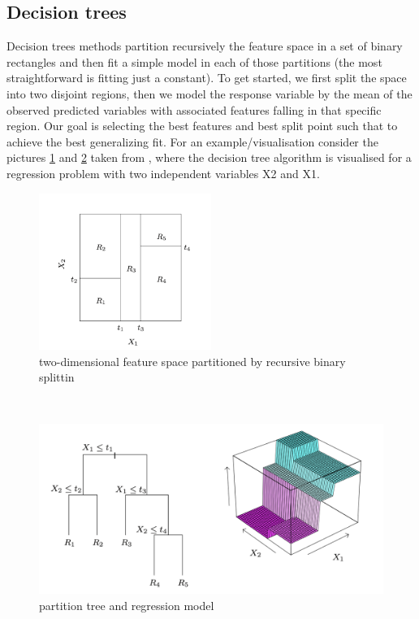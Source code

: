 \subsection{Decision trees}
Decision trees methods partition recursively the feature space in a set of binary rectangles and then fit a simple model in each of those partitions (the most straightforward is fitting just a constant).
To get started, we first split the space into two disjoint regions, then we model the response variable by the mean of the observed predicted variables with associated features falling in that specific region. Our goal is selecting the best features and best split point such that to achieve the best generalizing fit.
For an example/visualisation consider the pictures \ref{fig:elements_statistical_learning1} and \ref{fig:elements_statistical_learning2} taken from \cite{hastie2009elements}, where the decision tree algorithm is visualised for a regression problem with two independent variables X2 and X1.
\begin{figure}
    \includegraphics[width=0.5\textwidth]{images/elsii1.png}
    \caption{two-dimensional feature space partitioned by recursive binary splittin}
    \label{fig:elements_statistical_learning1}
  \end{figure}
\\
\begin{figure}
\includegraphics[width=1\textwidth]{images/elsii2.png}
\caption{partition tree and regression model}
\label{fig:elements_statistical_learning2}
\end{figure}
